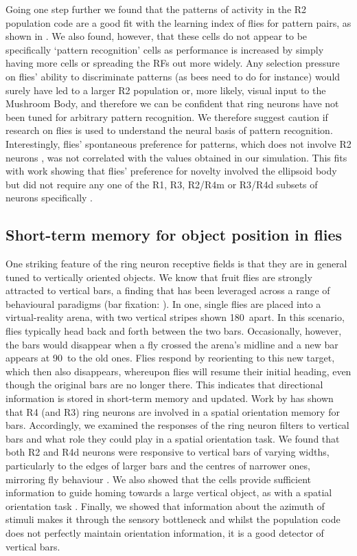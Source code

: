 \documentclass[10pt]{article}
\begin{document}
Going one step further we found that the patterns of activity in the R2 population code are a good fit with the learning index of flies for pattern pairs, as shown in \cite{Ernst1999}. We also found, however, that these cells do not appear to be specifically ‘pattern recognition’ cells as performance is increased by simply having more cells or spreading the RFs out more widely. Any selection pressure on flies’ ability to discriminate patterns (as bees need to do for instance) would surely have led to a larger R2 population or, more likely, visual input to the Mushroom Body, and therefore we can be confident that ring neurons have not been tuned for arbitrary pattern recognition. We therefore suggest caution if research on flies is used to understand the neural basis of pattern recognition.
Interestingly, flies’ spontaneous preference for patterns, which does not involve R2 neurons \cite{Ernst1999}, was not correlated with the values obtained in our simulation. This fits with work showing that flies’ preference for novelty involved the ellipsoid body but did not require any one of the R1, R3, R2/R4m or R3/R4d subsets of neurons specifically \cite{Solanki2015}. 

\subsection*{Short-term memory for object position in flies}
One striking feature of the ring neuron receptive fields is that they are in general tuned to vertically oriented objects. We know that fruit flies are strongly attracted to vertical bars, a finding that has been leveraged across a range of behavioural paradigms (bar fixation: \cite{Neuser2008}). In one, single flies are placed into a virtual-reality arena, with two vertical stripes shown 180\degree\ apart. In this scenario, flies typically head back and forth between the two bars. Occasionally, however, the bars would disappear when a fly crossed the arena’s midline and a new bar appears at 90\degree\ to the old ones. Flies respond by reorienting to this new target, which then also disappears, whereupon flies will resume their initial heading, even though the original bars are no longer there. This indicates that directional information is stored in short-term memory and updated. Work by \cite{Neuser2008} has shown that R4 (and R3) ring neurons are involved in a spatial orientation memory for bars. 
Accordingly, we examined the responses of the ring neuron filters to vertical bars and what role they could play in a spatial orientation task. We found that both R2 and R4d neurons were responsive to vertical bars of varying widths, particularly to the edges of larger bars and the centres of narrower ones, mirroring fly behaviour \cite{Osorio1990}. We also showed that the cells provide sufficient information to guide homing towards a large vertical object, as with a spatial orientation task \cite{Neuser2008}. Finally, we showed that information about the azimuth of stimuli makes it through the sensory bottleneck and whilst the population code does not perfectly maintain orientation information, it is a good detector of vertical bars.
\end{document}
